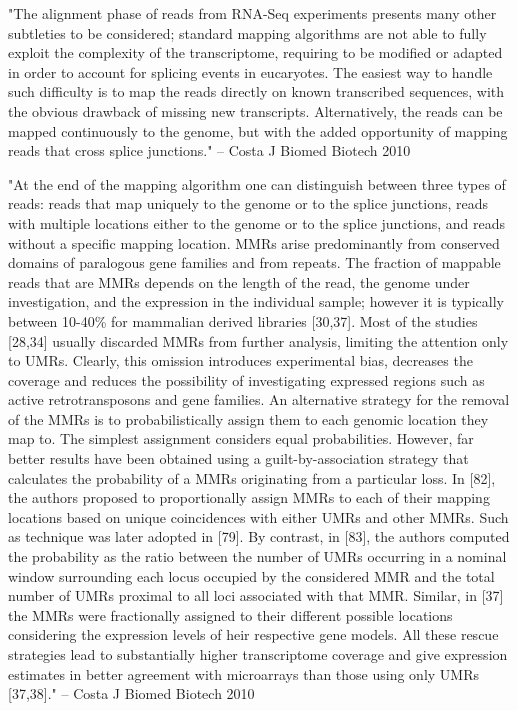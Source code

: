 \documentclass[10pt]{article}
\begin{document}
"The alignment phase of reads from RNA-Seq experiments presents many other subtleties to be considered; standard mapping algorithms are not able to fully exploit the complexity of the transcriptome, requiring to be modified or adapted in order to account for splicing events in eucaryotes.  The easiest way to handle such difficulty is to map the reads directly on known transcribed sequences, with the obvious drawback of missing new transcripts.  Alternatively, the reads can be mapped continuously to the genome, but with the added opportunity of mapping reads that cross splice junctions."  -- Costa J Biomed Biotech 2010

"At the end of the mapping algorithm one can distinguish between three types of reads: reads that map uniquely to the genome or to the splice junctions, reads with multiple locations either to the genome or to the splice junctions, and reads without a specific mapping location.  MMRs arise predominantly from conserved domains of paralogous gene families and from repeats.  The fraction of mappable reads that are MMRs depends on the length of the read, the genome under investigation, and the expression in the individual sample; however it is typically between 10-40\% for mammalian derived libraries [30,37].  Most of the studies [28,34] usually discarded MMRs from further analysis, limiting the attention only to UMRs.  Clearly, this omission introduces experimental bias, decreases the coverage and reduces the possibility of investigating expressed regions such as active retrotransposons and gene families.  An alternative strategy for the removal of the MMRs is to probabilistically assign them to each genomic location they map to.  The simplest assignment considers equal probabilities.  However, far better results have been obtained using a guilt-by-association strategy that calculates the probability of a MMRs originating from a particular loss.  In [82], the authors proposed to proportionally assign MMRs to each of their mapping locations based on unique coincidences with either UMRs and other MMRs.  Such as technique was later adopted in [79].  By contrast, in [83], the authors computed the probability as the ratio between the number of UMRs occurring in a nominal window surrounding each locus occupied by the considered MMR and the total number of UMRs proximal to all loci associated with that MMR.  Similar, in [37] the MMRs were fractionally assigned to their different possible locations considering the expression levels of heir respective gene models.  All these rescue strategies lead to substantially higher transcriptome coverage and give expression estimates in better agreement with microarrays than those using only UMRs [37,38]." -- Costa J Biomed Biotech 2010
\end{document}
